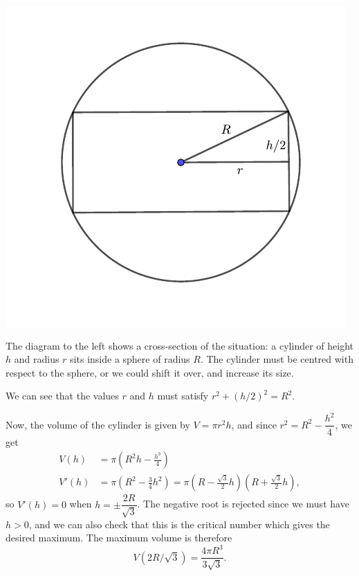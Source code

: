 \documentclass[12pt]{article}
\begin{document}
\begin{enumerate}
  \medskip
  
  \begin{multicols}{2}
  \includegraphics[width=\columnwidth]{Tut9-6sol}
 
  \columnbreak
  
  The diagram to the left shows a cross-section of the situation: a cylinder of height $h$ and radius $r$ sits inside a sphere of radius $R$. The cylinder must be centred with respect to the sphere, or we could shift it over, and increase its size.
  
  We can see that the values $r$ and $h$ must satisfy $r^2+(h/2)^2=R^2$.
   \end{multicols}
   Now, the volume of the cylinder is given by $V=\pi r^2h$, and since $r^2 = R^2-\dfrac{h^2}{4}$, we get
   \begin{align*}
   V(h) & = \pi\left(R^2 h-\frac{h^3}{4}\right)\\
   V'(h) & = \pi \left(R^2-\frac34 h^2\right) = \pi \left(R-\frac{\sqrt{3}}{2}h\right)\left(R+\frac{\sqrt{3}}{2}h\right),
   \end{align*}
   so $V'(h)=0$ when $h = \pm \dfrac{2R}{\sqrt{3}}$. The negative root is rejected since we must have $h>0$, and we can also check that this is the critical number which gives the desired maximum. The maximum volume is therefore
   \[
   V(2R/\sqrt{3}) = \frac{4\pi R^3}{3\sqrt{3}}.
   \]
    \end{enumerate}
\end{document}
